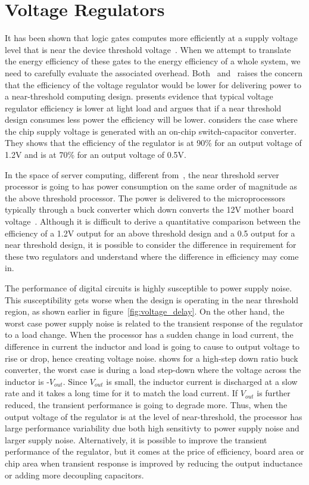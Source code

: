 \section{Voltage Regulators}

It has been shown that logic gates computes more efficiently at a supply voltage level
that is near the device threshold voltage~\cite{Dreslinski:2010ez}. When we attempt to translate the
energy efficiency of these gates to the energy efficiency of a whole system, we
need to carefully evaluate the associated overhead.
Both~\cite{ISLPED:2011}
and~\cite{Pitfall:2010} raises the concern that the efficiency
of the voltage regulator would be lower for delivering power to a near-threshold
computing design. \cite{ISLPED:2011} presents evidence that
typical voltage regulator efficiency is lower at light load and argues that if a
near threshold design consumes less power the efficiency will be lower.
\cite{Pitfall:2010} considers the case where the chip supply
voltage is generated with an on-chip switch-capacitor converter. They shows that
the efficiency of the regulator is at 90\% for an output voltage of 1.2V and is
at 70\% for an output voltage of 0.5V.

In the space of server computing, different from~\cite{Pitfall:2010}, the near threshold server processor is going to has power consumption on the same order of magnitude as the above threshold processor. The power is delivered to the
microprocessors typically through a buck converter which down converts the 12V
mother board voltage~\cite{Server:2006}. Although it is
difficult to derive a quantitative comparison between the efficiency of a 1.2V
output for an above threshold design and a 0.5 output for a near threshold
design, it is possible to consider the difference in requirement for these two
regulators and understand where the difference in efficiency may come in. 

The performance of digital circuits is highly susceptible to power supply noise.
This susceptibility gets worse when the design is operating in the near threshold
region, as shown earlier in figure~\ref{fig:voltage_delay}. On the other hand,
the worst case power supply noise is related to the transient response of the regulator to a load change. When the processor has a sudden change in load current,  the difference in current the inductor and load is going to cause to output voltage to rise or drop, hence creating voltage noise. \cite{Transient} shows for a high-step down ratio buck converter, the worst case is during a load step-down where the voltage across the inductor is -$V_{out}$. Since $V_{out}$ is small, the inductor current is discharged at a slow rate and it takes a long time for it to match the load current. If  $V_{out}$ is further reduced, the transient performance is going to degrade more. Thus, when the output voltage of the regulator is at the level of near-threshold, the processor has large performance variability due both high sensitivty to power supply noise and  larger supply noise. 
Alternatively, it is possible to  improve the transient performance of the regulator, but it comes at the price of efficiency, board area
or chip area when transient response is improved by reducing the output inductance or adding more decoupling capacitors.	

